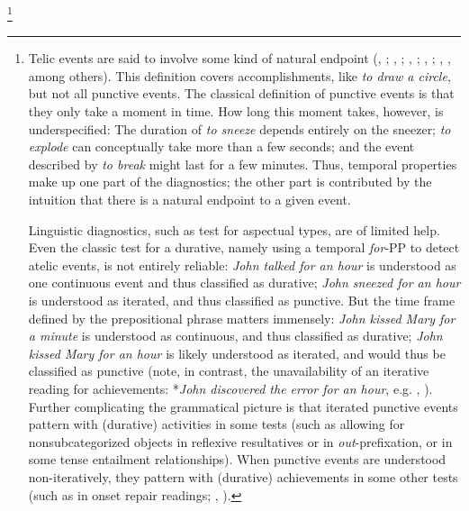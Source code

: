 \documentclass[preprint,12pt,authoryear]{elsarticle}
\begin{document}
\footnote{\label{aspectualdistinction}Telic events are said to involve some kind of natural endpoint (\citeauthor{andersson1972aktionalitat}, \citeyear{andersson1972aktionalitat}; \citeauthor{garey1957verbal}, \citeyear{garey1957verbal}; \citeauthor{bauer1970english}, \citeyear{bauer1970english}; \citeauthor{klein1994time}, \citeyear{klein1994time}; \citeauthor{Vendler1957}, \citeyear{Vendler1957}, among others). This definition covers accomplishments, like \emph{to draw a circle}, but not all punctive events. The classical definition of punctive events is that they only take a moment in time. How long this moment takes, however, is underspecified: The duration of \emph{to sneeze} depends entirely on the sneezer; \emph{to explode} can conceptually take more than a few seconds; and the event described by \emph{to break} might last for a few minutes. Thus, temporal properties make up one part of the diagnostics; the other part is contributed by the intuition that there is a natural endpoint to a given event.

Linguistic diagnostics, such as test for aspectual types, are of limited help. Even the classic test for a durative, namely using a temporal \emph{for}-PP to detect {atelic} events, is not entirely reliable: \emph{John talked for an hour} is understood as one continuous event and thus classified as durative; \emph{John sneezed for an hour} is understood as iterated, and thus classified as punctive. But the time frame defined by the prepositional phrase matters immensely: \emph{John kissed Mary for a minute} is understood as continuous, and thus classified as durative; \emph{John kissed Mary for an hour} is likely understood as iterated, and would thus be classified as punctive (note, in contrast, the unavailability of an iterative reading for achievements: *\emph{John discovered the error for an hour}, e.g. \citeauthor{bott2010}, \citeyear{bott2010}). Further complicating the grammatical picture is that iterated punctive events pattern with (durative) activities in some tests (such as allowing for nonsubcategorized objects in reflexive resultatives or in \emph{out}-prefixation, or in some tense entailment relationships). When punctive events are understood non-iteratively, they pattern with (durative) achievements in some other tests (such as in onset repair readings; \citeauthor{kearns2000semantics}, \citeyear{kearns2000semantics}).

}
\end{document}
